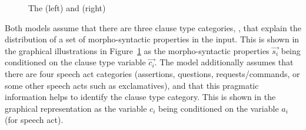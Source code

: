 \begin{figure}[H]
\begin{minipage}[b]{0.45\linewidth}	
\begin{center}
\end{center}
\end{minipage}
\hspace{0.5cm}
\begin{minipage}[b]{0.45\linewidth}	
\begin{center}
\end{center}
\end{minipage}
\caption{The  \distlearner{} (left) and \praglearner{} (right)}\label{fig:engcl:model}
\end{figure}




Both models assume that there are three clause type categories, \diis{}, that explain the distribution of a set of morpho-syntactic properties in the input. This is shown in the graphical illustrations in Figure~\ref{fig:engcl:model} as the morpho-syntactic properties $\vec{s_{i}}$ being conditioned on the clause type variable $\vec{c_{i}}$. The \plearnerabbr{} model additionally assumes that there are four speech act categories (assertions, questions, requests/commands, or some other speech acts such as exclamatives), and that this pragmatic information helps to identify the clause type category. This is shown in the graphical representation as the variable $c_{i}$ being conditioned on the variable $a_{i}$ (for speech act). 

